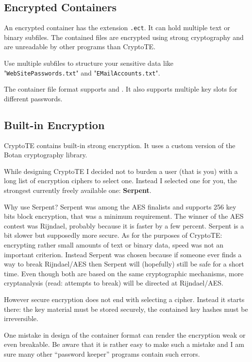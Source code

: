 \documentclass[a4paper,12pt,twoside,draft]{article}
\begin{document}
\subsection{Encrypted Containers}\label{Containers}

An encrypted container has the extension \texttt{.ect}. It can hold multiple text or binary subfiles. The contained files are encrypted using strong cryptography and are unreadable by other programs than CryptoTE.

Use multiple subfiles to structure your sensitive data like "\texttt{Web\-Site\-Passwords.txt}" and "\texttt{EMail\-Accounts.txt}".

The container file format supports  and . It also supports multiple key slots for different passwords.

\subsection{Built-in Encryption}\label{Encryption}

CryptoTE contains built-in strong encryption. It uses a custom version of the Botan cryptography library.

While designing CryptoTE I decided not to burden a user (that is you) with a long list of encryption ciphers to select one. Instead I selected one for you, the strongest currently freely available one: \textbf{Serpent}.

Why use Serpent? Serpent was among the AES finalists and supports 256 key bits block encryption, that was a minimum requirement. The winner of the AES contest was Rijndael, probably because it is faster by a few percent. Serpent is a bit slower but supposedly more secure. As for the purposes of CryptoTE: encrypting rather small amounts of text or binary data, speed was not an important criterion. Instead Serpent was chosen because if someone ever finds a way to break Rijndael/AES then Serpent will (hopefully) still be safe for a short time. Even though both are based on the same cryptographic mechanisms, more cryptanalysis (read: attempts to break) will be directed at Rijndael/AES.

However secure encryption does not end with selecting a cipher. Instead it starts there: the key material must be stored securely, the contained key hashes must be irreversible.

One mistake in design of the container format can render the encryption weak or even breakable. Be aware that it is rather easy to make such a mistake and I am sure many other ``password keeper'' programs contain such errors.
\end{document}
